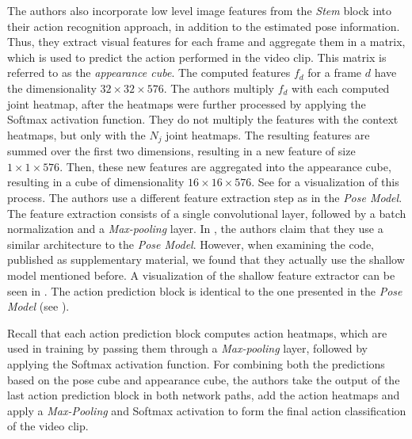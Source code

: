 The authors also incorporate low level image features from the \textit{Stem} block into their action recognition approach, in addition to the estimated pose information.
Thus, they extract visual features for each frame and aggregate them in a matrix, which is used to predict the action performed in the video clip.
This matrix is referred to as the \textit{appearance cube}.
The computed features $f_d$ for a frame $d$ have the dimensionality $32 \times 32 \times 576$.
The authors multiply $f_d$ with each computed joint heatmap, after the heatmaps were further processed by applying the Softmax activation function.
They do not multiply the features with the context heatmaps, but only with the $N_j$ joint heatmaps.
The resulting features are summed over the first two dimensions, resulting in a new feature of size $1 \times 1 \times 576$.
Then, these new features are aggregated into the appearance cube, resulting in a cube of dimensionality $16 \times 16 \times 576$.
See  for a visualization of this process.
The authors use a different feature extraction step as in the \textit{Pose Model}.
The feature extraction consists of a single convolutional layer, followed by a batch normalization and a \textit{Max-pooling} layer.
In \cite{luvizon_2d/3d_2018}, the authors claim that they use a similar architecture to the \textit{Pose Model}.
However, when examining the code, published as supplementary material, we found that they actually use the shallow model mentioned before.
A visualization of the shallow feature extractor can be seen in .
The action prediction block is identical to the one presented in the \textit{Pose Model} (see ).

Recall that each action prediction block computes action heatmaps, which are used in training by passing them through a \textit{Max-pooling} layer, followed by applying the Softmax activation function.
For combining both the predictions based on the pose cube and appearance cube, the authors take the output of the last action prediction block in both network paths, add the action heatmaps and apply a \textit{Max-Pooling} and Softmax activation to form the final action classification of the video clip. 

